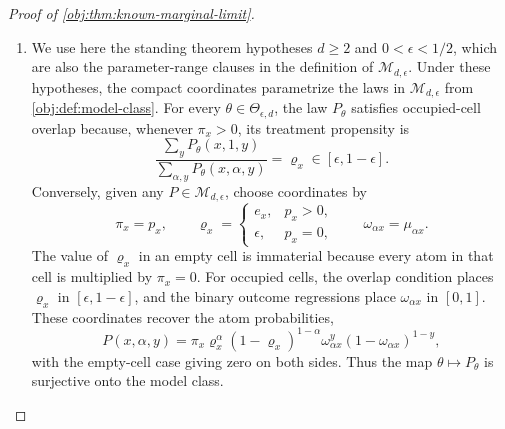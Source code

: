 \documentclass[11pt]{article}
\begin{document}
\begin{proof}[Proof of \cref{obj:thm:known-marginal-limit}]
\begin{enumerate}
\[
\bigl(\psi_\varphi(z,\xi_\theta)-\upsilon_\theta\bigr)^2
=
\left(
\sum_{u\in\mathcal C_d^m}
\Bigl(\prod_{j=1}^m\xi_\theta(u_j)\Bigr)
\bigl(\varphi(z,u)-\upsilon_\theta\bigr)
\right)^2
\le
\sum_{u\in\mathcal C_d^m}
\Bigl(\prod_{j=1}^m\xi_\theta(u_j)\Bigr)
\bigl(\varphi(z,u)-\upsilon_\theta\bigr)^2 .
\]
Multiplying by \(\lambda_\theta(z)\), summing over \(z\), and then taking the supremum over \(\theta\) gives
\[
\sup_{\theta}
\sum_{z\in\mathcal Z_n}\lambda_\theta(z)
\bigl(\psi_\varphi(z,\xi_\theta)-\upsilon_\theta\bigr)^2
\le
\sup_{\theta}
\sum_{z\in\mathcal Z_n}\lambda_\theta(z)
\sum_{u\in\mathcal C_d^m}
\Bigl(\prod_{j=1}^m\xi_\theta(u_j)\Bigr)
\bigl(\varphi(z,u)-\upsilon_\theta\bigr)^2 .
\]
Taking the infimum over \(\varphi\) yields
\[
\widetilde{\mathfrak R}_\star\le \mathfrak R_m
\qquad\text{for every }m\ge0 .
\]
Taking the limit along the displayed convergence yields
\[
\widetilde{\mathfrak R}_\star\le \lim_{m\to\infty}\mathfrak R_m=\mathfrak R_\star .
\]
The two inequalities identify the ambient measurable exact-table value with the exact-side value:
\[
\widetilde{\mathfrak R}_\star=\mathfrak R_\star .
\]

\item\label{pf:known-marginal-limit:known-risk} We use here the standing
theorem hypotheses \(d\ge2\) and \(0<\epsilon<1/2\), which are also the
parameter-range clauses in the definition of \(\mathcal M_{d,\epsilon}\).
Under these hypotheses, the compact coordinates parametrize the laws in
\(\mathcal M_{d,\epsilon}\) from \cref{obj:def:model-class}.  For every \(\theta\in\Theta_{\epsilon,d}\), the law \(P_\theta\) satisfies occupied-cell overlap because, whenever \(\pi_x>0\), its treatment propensity is
\[
\frac{\sum_y P_\theta(x,1,y)}{\sum_{\alpha,y}P_\theta(x,\alpha,y)}
=\varrho_x\in[\epsilon,1-\epsilon].
\]
Conversely, given any \(P\in\mathcal M_{d,\epsilon}\), choose coordinates by
\[
\pi_x=p_x,
\qquad
\varrho_x=
\begin{cases}
 e_x, & p_x>0,\\
 \epsilon, & p_x=0,
\end{cases}
\qquad
\omega_{\alpha x}=\mu_{\alpha x}.
\]
The value of \(\varrho_x\) in an empty cell is immaterial because every atom in that cell is multiplied by \(\pi_x=0\).  For occupied cells, the overlap condition places \(\varrho_x\) in \([\epsilon,1-\epsilon]\), and the binary outcome regressions place \(\omega_{\alpha x}\) in \([0,1]\).  These coordinates recover the atom probabilities,
\[
P(x,\alpha,y)
=
\pi_x\varrho_x^\alpha(1-\varrho_x)^{1-\alpha}
\omega_{\alpha x}^y(1-\omega_{\alpha x})^{1-y},
\]
with the empty-cell case giving zero on both sides.  Thus the map \(\theta\mapsto P_\theta\) is surjective onto the model class.


\end{enumerate}
\end{proof}
\end{document}
